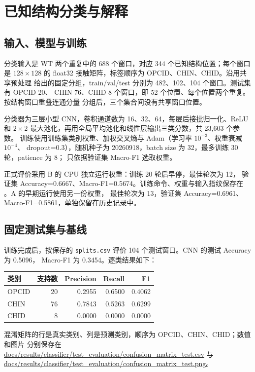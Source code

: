 \section{已知结构分类与解释}

\subsection{输入、模型与训练}
分类输入是 WT 两个重复中的 688 个窗口，对应 344 个已知结构位置；每个窗口是
$128\times128$ 的 float32 接触矩阵，标签顺序为 OPCID、CHIN、CHID。沿用共享预处理
给出的固定分组，train/val/test 分别为 482、102、104 个窗口。测试集有 OPCID 20、
CHIN 76、CHID 8 个窗口，即 52 个位置、每个位置两个重复。按结构窗口重叠连通分量
分组后，三个集合间没有共享窗口位置。

分类器为三层小型 CNN，卷积通道数为 16、32、64，每层后接批归一化、ReLU 和
$2\times2$ 最大池化，再用全局平均池化和线性层输出三类分数，共 23,603 个参数。
训练使用训练集类别权重、加权交叉熵与 Adam（学习率 $10^{-3}$、权重衰减 $10^{-4}$、
dropout=0.3），随机种子为 20260918，batch size 为 32，最多训练 30 轮，patience 为 8；
只依据验证集 Macro-F1 选取权重。

正式评价采用 B 的 CPU 独立运行权重：训练 20 轮后早停，最佳轮次为 12，
验证集 Accuracy=0.6667、Macro-F1=0.5674。训练命令、权重与输入指纹保存在
。A 的早期运行使用另一份权重，
最佳轮次为 13，验证集 Accuracy=0.6961、Macro-F1=0.5861，单独保留在历史记录中。

\subsection{固定测试集与基线}
训练完成后，按保存的 \texttt{splits.csv} 评价 104 个测试窗口。CNN 的测试 Accuracy 为 0.5096，
Macro-F1 为 0.3454。逐类结果如下：

\begin{center}
\small
\begin{tabular}{lrrrr}
\toprule
类别 & 支持数 & Precision & Recall & F1 \\
\midrule
OPCID & 20 & 0.2955 & 0.6500 & 0.4062 \\
CHIN & 76 & 0.7843 & 0.5263 & 0.6299 \\
CHID & 8 & 0.0000 & 0.0000 & 0.0000 \\
\bottomrule
\end{tabular}
\end{center}

混淆矩阵的行是真实类别、列是预测类别，顺序为 OPCID、CHIN、CHID；数值和图片
分别保存在 \url{docs/results/classifier/test_evaluation/confusion_matrix_test.csv} 与
\url{docs/results/classifier/test_evaluation/confusion_matrix_test.png}。

